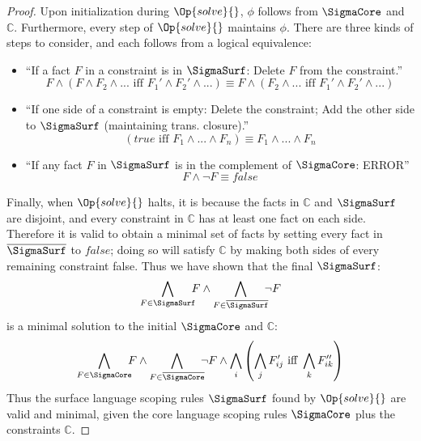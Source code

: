\begin{proof}
    Upon initialization during $\Op{solve}{}$, $\phi$ follows from
    $\SigmaCore$ and $\mathbb{C}$. Furthermore, every step of $\Op{solve}{}$
    maintains $\phi$. There are three kinds of steps to consider, and
    each follows from a logical equivalence:
    \begin{itemize}
    \item ``If a fact $F$ in a constraint is in $\SigmaSurf$:
      Delete $F$ from the constraint.''
      \[ F \wedge (F \wedge F_2 \wedge ...
         \text{ iff } F_1' \wedge F_2' \wedge ...)
         \equiv
         F \wedge (F_2 \wedge ...
         \text{ iff } F_1' \wedge F_2' \wedge ...)
      \]
    \item ``If one side of a constraint is empty:
      Delete the constraint;
      Add the other side to $\SigmaSurf$ (maintaining trans. closure).''
      \[ (\mathit{true} \text{ iff } F_1 \wedge ... \wedge F_n)
         \equiv
         F_1 \wedge ... \wedge F_n
      \]
    \item ``If any fact $F$ in $\SigmaSurf$ is in the complement of
      $\SigmaCore$: ERROR''
      \[ F \wedge \neg F \equiv \mathit{false} \]
    \end{itemize}
  
    Finally, when $\Op{solve}{}$ halts, it is because the facts in $\mathbb{C}$
    and $\SigmaSurf$ are disjoint, and every constraint in $\mathbb{C}$ has at
    least one fact on each side. Therefore it is valid to obtain a
    minimal set of facts by setting every
    fact in $\overline\SigmaSurf$ to $\mathit{false}$; doing so will
    satisfy $\mathbb{C}$ by making both sides of every remaining constraint
    false. Thus we have shown that the final $\SigmaSurf$:
    \[ \bigwedge_{F \in \SigmaSurf}\hspace{-0.5em}F \wedge
       \bigwedge_{F \in \overline \SigmaSurf}\hspace{-0.5em}\neg F
    \]
    is a minimal solution to the initial $\SigmaCore$ and $\mathbb{C}$:
    \[ \bigwedge_{F \in \SigmaCore}\hspace{-0.5em}F \wedge
       \bigwedge_{F \in \overline \SigmaCore}\hspace{-0.5em}\neg F \wedge
       \bigwedge_i \left(\bigwedge_j F_{ij}' \text{ iff } \bigwedge_k F_{ik}''\right)
    \]
    Thus the surface language scoping rules $\SigmaSurf$ found by
    $\Op{solve}{}$ are valid and minimal, given the core language scoping rules
    $\SigmaCore$ plus the constraints $\mathbb{C}$.
  \end{proof}
  
